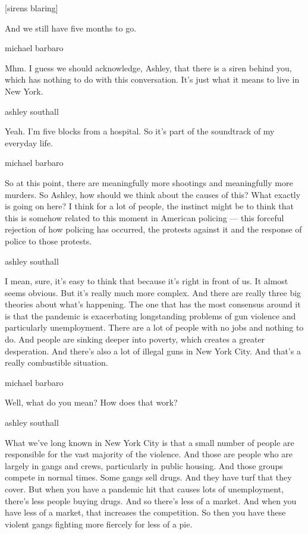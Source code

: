 {[}sirens blaring{]}

And we still have five months to go.

michael barbaro

Mhm. I guess we should acknowledge, Ashley, that there is a siren behind
you, which has nothing to do with this conversation. It's just what it
means to live in New York.

ashley southall

Yeah. I'm five blocks from a hospital. So it's part of the soundtrack of
my everyday life.

michael barbaro

So at this point, there are meaningfully more shootings and meaningfully
more murders. So Ashley, how should we think about the causes of this?
What exactly is going on here? I think for a lot of people, the instinct
might be to think that this is somehow related to this moment in
American policing --- this forceful rejection of how policing has
occurred, the protests against it and the response of police to those
protests.

ashley southall

I mean, sure, it's easy to think that because it's right in front of us.
It almost seems obvious. But it's really much more complex. And there
are really three big theories about what's happening. The one that has
the most consensus around it is that the pandemic is exacerbating
longstanding problems of gun violence and particularly unemployment.
There are a lot of people with no jobs and nothing to do. And people are
sinking deeper into poverty, which creates a greater desperation. And
there's also a lot of illegal guns in New York City. And that's a really
combustible situation.

michael barbaro

Well, what do you mean? How does that work?

ashley southall

What we've long known in New York City is that a small number of people
are responsible for the vast majority of the violence. And those are
people who are largely in gangs and crews, particularly in public
housing. And those groups compete in normal times. Some gangs sell
drugs. And they have turf that they cover. But when you have a pandemic
hit that causes lots of unemployment, there's less people buying drugs.
And so there's less of a market. And when you have less of a market,
that increases the competition. So then you have these violent gangs
fighting more fiercely for less of a pie.

